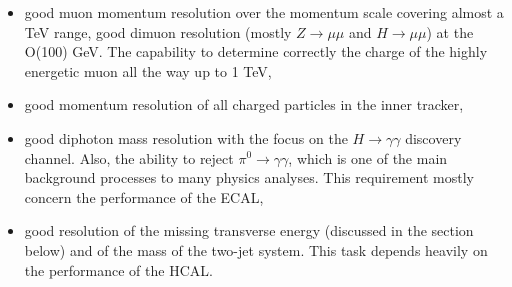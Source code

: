 \begin{normalsize}
\begin{itemize}
\item good muon momentum resolution over the momentum scale covering almost a TeV range, good dimuon resolution (mostly $Z \rightarrow \mu \mu$ and $H \rightarrow \mu \mu$) at the O(100) GeV. The capability to determine correctly the charge of the highly energetic muon all the way up to 1 TeV,
\item good momentum resolution of all charged particles in the inner tracker,
\item good diphoton mass resolution with the focus on the $H \rightarrow \gamma \gamma$ discovery channel. Also, the ability to reject $\pi^0 \rightarrow \gamma \gamma$, which is one of the main background processes to many physics analyses.  This requirement mostly concern the performance of the ECAL,
\item good resolution of the missing transverse energy (discussed in the section below) and of the mass of the two-jet system. This task depends heavily on the performance of the HCAL.
\end{itemize}





\end{normalsize}       %
 
